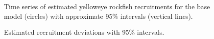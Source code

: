 \documentclass[
]{scrartcl}
\begin{document}
\begin{figure}[H]


\caption{\label{fig-es-recruits}Time series of estimated yelloweye
rockfish recruitments for the base model (circles) with approximate 95\%
intervals (vertical lines).}

\end{figure}%

\begin{figure}[H]


\caption{\label{fig-es-recdev}Estimated recruitment deviations with 95\%
intervals.}

\end{figure}%
\end{document}
